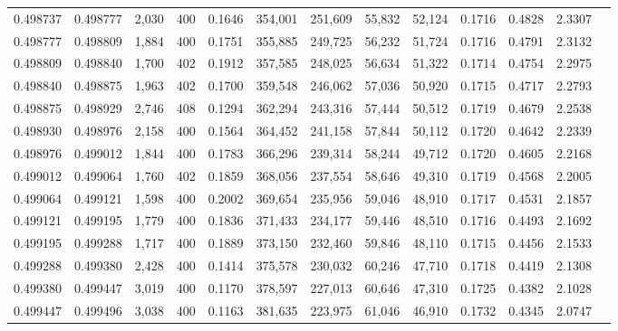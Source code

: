 \begin{tabular}{rrrrrrrrrrrrr}
0.498737 & 0.498777 & 2,030 & 400 &                                     0.1646 & 354,001 & 251,609 &  55,832 &  52,124 & 0.1716 & 0.4828 & 2.3307 \\
0.498777 & 0.498809 & 1,884 & 400 &                                     0.1751 & 355,885 & 249,725 &  56,232 &  51,724 & 0.1716 & 0.4791 & 2.3132 \\
0.498809 & 0.498840 & 1,700 & 402 &                                     0.1912 & 357,585 & 248,025 &  56,634 &  51,322 & 0.1714 & 0.4754 & 2.2975 \\
0.498840 & 0.498875 & 1,963 & 402 &                                     0.1700 & 359,548 & 246,062 &  57,036 &  50,920 & 0.1715 & 0.4717 & 2.2793 \\
0.498875 & 0.498929 & 2,746 & 408 &                                     0.1294 & 362,294 & 243,316 &  57,444 &  50,512 & 0.1719 & 0.4679 & 2.2538 \\
0.498930 & 0.498976 & 2,158 & 400 &                                     0.1564 & 364,452 & 241,158 &  57,844 &  50,112 & 0.1720 & 0.4642 & 2.2339 \\
0.498976 & 0.499012 & 1,844 & 400 &                                     0.1783 & 366,296 & 239,314 &  58,244 &  49,712 & 0.1720 & 0.4605 & 2.2168 \\
0.499012 & 0.499064 & 1,760 & 402 &                                     0.1859 & 368,056 & 237,554 &  58,646 &  49,310 & 0.1719 & 0.4568 & 2.2005 \\
0.499064 & 0.499121 & 1,598 & 400 &                                     0.2002 & 369,654 & 235,956 &  59,046 &  48,910 & 0.1717 & 0.4531 & 2.1857 \\
0.499121 & 0.499195 & 1,779 & 400 &                                     0.1836 & 371,433 & 234,177 &  59,446 &  48,510 & 0.1716 & 0.4493 & 2.1692 \\
0.499195 & 0.499288 & 1,717 & 400 &                                     0.1889 & 373,150 & 232,460 &  59,846 &  48,110 & 0.1715 & 0.4456 & 2.1533 \\
0.499288 & 0.499380 & 2,428 & 400 &                                     0.1414 & 375,578 & 230,032 &  60,246 &  47,710 & 0.1718 & 0.4419 & 2.1308 \\
0.499380 & 0.499447 & 3,019 & 400 &                                     0.1170 & 378,597 & 227,013 &  60,646 &  47,310 & 0.1725 & 0.4382 & 2.1028 \\
0.499447 & 0.499496 & 3,038 & 400 &                                     0.1163 & 381,635 & 223,975 &  61,046 &  46,910 & 0.1732 & 0.4345 & 2.0747 \\

\end{tabular}
